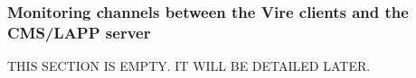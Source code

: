 
\subsubsection{Monitoring channels between the Vire clients and the CMS/LAPP server}

THIS SECTION IS EMPTY. IT WILL BE DETAILED LATER.

\vfill
\afterpage{\clearpage}
\pagebreak
